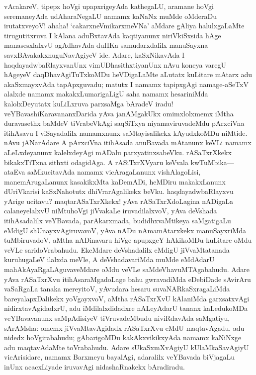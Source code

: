 \documentclass[11pt,a4size]{article}
\begin{document}
vAcakareV, tipepx hoVgi upapxri\-geyAda kathegaLU, aramane hoVgi
seremaneyAda udA\-haraNe\-gaLU namamx kaNaNx muMde oMderaDu irutatxveyoV!
ahaha! `cakarxneVmikarxmeVNa' aMdare gAliya halulxgaLaMte
tirugutitxruva I kAlana aduBxtavAda kaqtiyanunx niriVkiSxsida hAge
manasesxlalxvU agAdhavAda duHKa samudarxdalilx manuSayxna
savxBAvakakxnuguNavAgiyeV ide. Adare, kaSxNikavAda I
haqdayadwbaRlayxvanUnx vimUDhasithxtiyanUnx nAvu koneya varegU hAgeyeV
daqDhavAgiTuTxkoMDu heVDigaLaMte aLutatx kuLitare mAtarx adu
akaSxmayxvAda tapApxguvadu; matutx I namamx tapipxgAgi namage-aSeTxV
alalxde namamx makakxLumarigaLigU saha namamx hesariniMda
kalolxDeyutatx kuLiLxruva parxsaMga bAradeV iradu!
veYBavashiKaravananxDarida yAva janAMgakUkx omimxlolxmemx iMtha
duravasethx baMdeV tiVrabeVkAgi saqSiTxya niyamaviruvadeMdu pArxciVna
itihAsavu I viSayadalilx namamxnunx saMtayisalikekx kAyudxkoMDu
niMtide. nAvu jANarAdare A pArxciVna itihAsada anuBavada mAtanunx
keVLi namamx aLeLxdeyanunx kalelxdeyAgi mADalu
parxyatinxsabeVku. rASaTxrXkekx bikakxTiTxna sithxti odagidAga. A
rASiTxrXVyaru keVvala kwTuMbika---ataEva saMkucitavAda namamx
vicAragaLanunx vishAlagoLisi, manemArugaLanunx kasakikxMta kaDemADi,
heMDiru makakxLanunx dUriVkarisi kaSxNahotutx dhiVrarAgalikekx
beVku. haqdayadwbaRlayxvu yArige ucitavu? maqtarASaTxrXkekx! yAva
rASaTxrXdoLagina nADigaLa calaneyelalxvU niMtuhoVgi jiVvakaLe
iruvadilalxvoV, yAva deVshada itihAsadalilx veYBavada, parAkarxmada,
budidhxvaMtikeya saMgatigaLu eMdigU shUnayxvAgiruvavoV, yAva nADu
nAmamAtarxkekx manuSayxriMda tuMbiruvadoV, aMtha nADinavaru hiVge
apupxgeY hAkikoMDu kuLitare oMdu veVLe saridoVrabahudu. EkeMdare
deVshadalilx eMdigU jiVvaMtatanada kuruhugaLeV ilalxda meVle, A
deVshadavariMda muMde eMdAdarU mahAkAyaRgaLAguvaveMdare oMdu veVLe
saMdeVhavuMTAgabahudu. Adare yAva rASaTxrXvu itihAsaraMgadoLage bahu
gwravadiMda eDebiDade sAvirAru vaSaRgaLa tanaka mereyitoV, yAvudara
hesaru suvaNARkaSxragaLiMda bareyalapxDalikekx yoVgayxvoV, aMtha
rASaTxrXvU kAlaniMda garxsatxvAgi nidirxtavAgidadxrU, adu
iMdilalxdidadxre nALeyAdarU tananx kaLedukoMDa veYBavavanunx
saMpAdisiyeV tiVruvadeMbudu niviRdavAda saMgatiyu, sArAMsha: omemx
jiVvaMtavAgidadx rASaTxrXvu eMdU maqtavAgadu. adu nidedx
hoVgirabahudu; gAbarigoMDu kakAkxvikikxyAda namamx kaNiNxge adu
maqtavAdaMte toVrabahudu. Adare sUkaSxmXvAgiyU kUlaMkaSavAgiyU
vicArisidare, namamx Barxmeyu bayalAgi, adaralilx veYBavada biVjagaLu
inUnx acacxLiyade iruvavAgi nidashaRnakekx bAradiradu.
\end{document}
